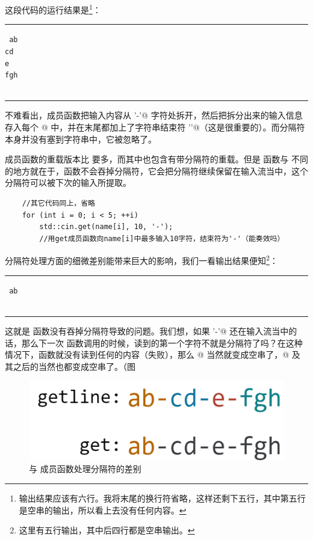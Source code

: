 这段代码的运行结果是\footnote{输出结果应该有六行。我将末尾的换行符省略，这样还剩下五行，其中第五行是空串的输出，所以看上去没有任何内容。}：\\\noindent\rule{\linewidth}{.2pt}\texttt{
ab\\
cd\\
e\\
fgh\\
\newline
}\\\noindent\rule{\linewidth}{.2pt}
不难看出，\lstinline@getline@ 成员函数把输入内容从 \lstinline@'-'@ 字符处拆开，然后把拆分出来的输入信息存入每个 \lstinline@name[i]@ 中，并在末尾都加上了字符串结束符 \lstinline@'\0'@（这是很重要的）。而分隔符本身并没有塞到字符串中，它被忽略了。\par
\lstinline@get@ 成员函数的重载版本比 \lstinline@getline@ 要多，而其中也包含有带分隔符的重载。但是 \lstinline@get@ 函数与 \lstinline@getline@ 不同的地方就在于，\lstinline@get@ 函数不会吞掉分隔符，它会把分隔符继续保留在输入流当中，这个分隔符可以被下次的输入所提取。
\begin{lstlisting}
    //其它代码同上，省略
    for (int i = 0; i < 5; ++i)
        std::cin.get(name[i], 10, '-');
        //用get成员函数向name[i]中最多输入10字符，结束符为'-'（能奏效吗）
\end{lstlisting}
分隔符处理方面的细微差别能带来巨大的影响，我们一看输出结果便知\footnote{这里有五行输出，其中后四行都是空串输出。}：\\\noindent\rule{\linewidth}{.2pt}\texttt{
ab\\
\newline
\newline
\newline
\newline
}\\\noindent\rule{\linewidth}{.2pt}
这就是 \lstinline@get@ 函数没有吞掉分隔符导致的问题。我们想，如果 \lstinline@'-'@ 还在输入流当中的话，那么下一次 \lstinline@get@ 函数调用的时候，读到的第一个字符不就是分隔符了吗？在这种情况下，\lstinline@get@ 函数就没有读到任何的内容（失败），那么 \lstinline@name[1]@ 当然就变成空串了，\lstinline@name[2]@ 及其之后的当然也都变成空串了。（图\par
\begin{figure}[htbp]
    \centering
    \includegraphics[width=.4\textwidth]{../images/generalized_parts/13_getline_vs_get.drawio.png}
    \caption{\lstinline@getline@ 与 \lstinline@get@ 成员函数处理分隔符的差别}
\end{figure}
